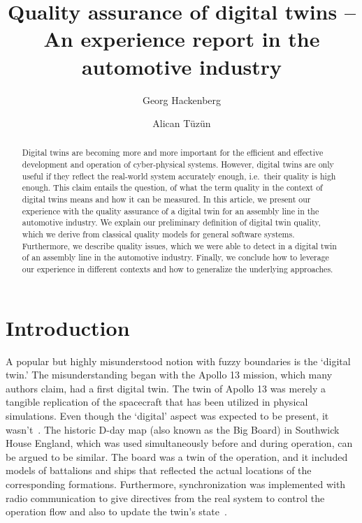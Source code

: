 \documentclass{llncs}
\begin{document}
    \title{Quality assurance of digital twins -- An experience report in the automotive industry}

    \author{Georg Hackenberg
    \and
    Alican Tüzün
    }
    
    \maketitle

    \begin{abstract}
        Digital twins are becoming more and more important for the efficient and effective development and operation of cyber-physical systems.
        However, digital twins are only useful if they reflect the real-world system accurately enough, i.e.\ their quality is high enough.
        This claim entails the question, of what the term quality in the context of digital twins means and how it can be measured.
        In this article, we present our experience with the quality assurance of a digital twin for an assembly line in the automotive industry.
        We explain our preliminary definition of digital twin quality, which we derive from classical quality models for general software systems.
        Furthermore, we describe quality issues, which we were able to detect in a digital twin of an assembly line in the automotive industry.
        Finally, we conclude how to leverage our experience in different contexts and how to generalize the underlying approaches.
    \end{abstract}

    \section{Introduction}\label{section:introduction}
    A popular but highly misunderstood notion with fuzzy boundaries is the `digital twin.' 
    The misunderstanding began with the Apollo 13 mission, which many authors claim, had a first digital twin. The twin of Apollo 13 was merely a tangible replication of the spacecraft that has been utilized in physical simulations. Even though the `digital' aspect was expected to be present, 
    it wasn't~\cite{GrievesApollo13}. The historic D-day map (also known as the Big Board) in Southwick House England, which was used simultaneously before and during operation, can be argued to be similar. 
    The board was a twin of the operation, and it included models of battalions and ships that reflected the actual locations of the corresponding formations. 
    Furthermore, synchronization was implemented with radio communication to give directives from the real system to control the operation flow and also to update the twin's state~\cite{AMRC}.
\end{document}
